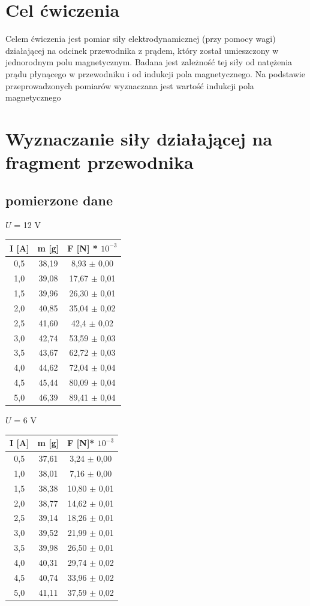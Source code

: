\documentclass{article}
\begin{document}
\section{Cel ćwiczenia}
Celem ćwiczenia jest pomiar siły elektrodynamicznej (przy pomocy wagi) działającej na odcinek przewodnika z prądem, który został umieszczony w jednorodnym polu magnetycznym. Badana jest zależność tej siły od natężenia prądu płynącego w przewodniku i od indukcji pola magnetycznego. Na podstawie przeprowadzonych pomiarów wyznaczana jest wartość indukcji pola magnetycznego

\section{Wyznaczanie siły działającej na fragment przewodnika}
\subsection{pomierzone dane}

$U$ = 12 V
\begin{center}
\begin{tabular}{ c | c | c}
I [A] & m [g] & F [N] * $10^{-3}$\\
\hline
0,5 & 38,19 & 8,93 $\pm$ 0,00\\
1,0 & 39,08 & 17,67 $\pm$ 0,01\\
1,5 & 39,96 & 26,30 $\pm$ 0,01\\
2,0 & 40,85 & 35,04 $\pm$ 0,02\\
2,5 & 41,60 & 42,4 $\pm$ 0,02\\
3,0 & 42,74 & 53,59 $\pm$ 0,03\\
3,5 & 43,67 & 62,72 $\pm$ 0,03\\ 
4,0 & 44,62 & 72,04 $\pm$ 0,04\\
4,5 & 45,44 & 80,09 $\pm$ 0,04\\
5,0 & 46,39 & 89,41 $\pm$ 0,04\\
\end{tabular}
\end{center}

$U$ = 6 V
\begin{center}
\begin{tabular}{ c | c | c}
I [A] & m [g] & F [N]* $10^{-3}$\\
\hline
0,5 & 37,61  & 3,24 $\pm$ 0,00\\
1,0 & 38,01  & 7,16 $\pm$ 0,00\\
1,5 & 38,38  & 10,80 $\pm$ 0,01\\
2,0 & 38,77  & 14,62 $\pm$ 0,01\\
2,5 & 39,14  & 18,26 $\pm$ 0,01\\
3,0 & 39,52  & 21,99 $\pm$ 0,01\\
3,5 & 39,98  & 26,50 $\pm$ 0,01\\
4,0 & 40,31  & 29,74 $\pm$ 0,02\\
4,5 & 40,74  & 33,96 $\pm$ 0,02\\
5,0 & 41,11  & 37,59 $\pm$ 0,02\\
\end{tabular}
\end{center}
\end{document}
